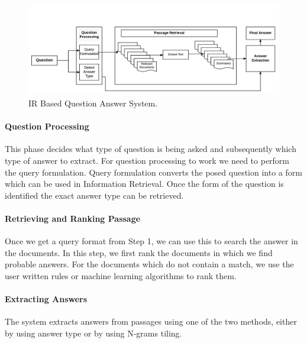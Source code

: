 \begin{figure}[htb]
\centering
\includegraphics[scale=0.8]{images/IR_BasedQA.jpg}
\caption{IR Based Question Answer System.} 
\label{fig:IR_BasedQA}
\end{figure}

\paragraph{Question Processing}
This phase decides what type of question is being asked and subsequently which type of answer to 
extract. For question processing to work we need to perform the query formulation. Query formulation converts the posed question into a form which can be used in Information Retrieval. Once the form of the question is identified the exact answer type can be retrieved. 
	
\paragraph{Retrieving and Ranking Passage}
Once we get a query format from Step 1, we can use this to search the answer in the documents.
In this step, we first rank the documents in which we find probable answers. For the documents which do not contain a match, we use the user written rules or machine learning algorithms to rank them.

\paragraph{Extracting Answers}
The system extracts answers from passages using one of the two methods, either by using answer type or by using N-grams tiling.

